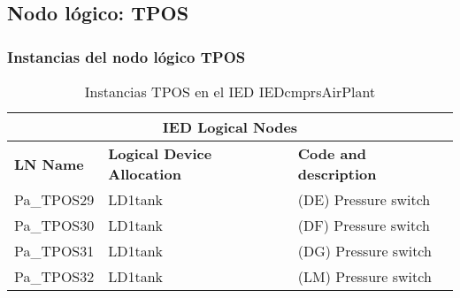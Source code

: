 
\subsection{Nodo l\'ogico: 			 TPOS}

    \subsubsection{Instancias del nodo l\'ogico TPOS}
    \begin{table}[H]
    \begin{center}
    \begin{tabular}{|l|l|p{6.8cm}|}
            \hline
            \multicolumn{3}{|c|}{\cellcolor[gray]{0.8} \textbf{IED Logical Nodes} } \\
            \hline
            \textbf{LN Name} & \textbf{Logical Device Allocation} & \textbf{Code and description} \\
            \hline
            Pa\_TPOS29 & LD1tank & (DE) Pressure switch \\
            \hline
            Pa\_TPOS30 & LD1tank & (DF) Pressure switch \\
            \hline
            Pa\_TPOS31 & LD1tank & (DG) Pressure switch \\
            \hline
            Pa\_TPOS32 & LD1tank & (LM) Pressure switch \\
            \hline
    \end{tabular}
    \caption{Instancias TPOS en el IED IEDcmprsAirPlant}
    \label{table:lnInstTPOS_prs_sw}
    \end{center}
    \end{table}
    
    
    
